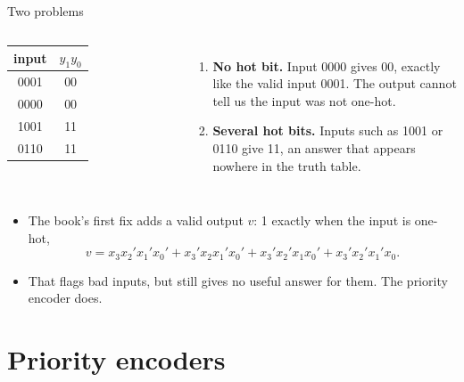 \documentclass[10pt]{wosm-slides}
\begin{document}
\begin{frame}{Two problems}
  \begin{columns}[T, totalwidth=\textwidth]
      \centering
      \begin{tabular}{@{}c|c@{}}
        input & $y_1 y_0$ \\
        \midrule
        0001 & 00 \\
        \alert{0000} & \alert{00} \\
        \alert{1001} & \alert{11} \\
        \alert{0110} & \alert{11} \\
      \end{tabular}
      \begin{enumerate}
        \item \textbf{No hot bit.} Input 0000 gives 00, exactly like the valid input
          0001. The output cannot tell us the input was not one-hot.
        \item \textbf{Several hot bits.} Inputs such as 1001 or 0110 give 11, an
          answer that appears nowhere in the truth table.
      \end{enumerate}
  \end{columns}

  \bigskip
  \begin{itemize}
    \item The book's first fix adds a \alert{valid} output $v$: 1 exactly when the
      input is one-hot,
      \[ v = x_3x_2'x_1'x_0' + x_3'x_2x_1'x_0' + x_3'x_2'x_1x_0' + x_3'x_2'x_1'x_0 . \]
    \item That flags bad inputs, but still gives no useful answer for them. The
      priority encoder does.
  \end{itemize}
\end{frame}

\section{Priority encoders}
\end{document}

